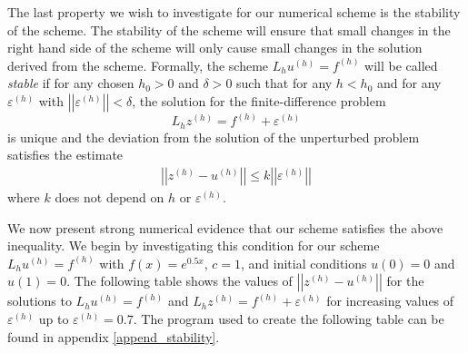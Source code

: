 The last property we wish to investigate for our numerical scheme is the
stability of the scheme. The stability of the scheme will ensure that small
changes in the right hand side of the scheme will only cause small changes in
the solution derived from the scheme. Formally, the scheme $L_h u^{(h)} = f^{(h)}$
will be called \textit{stable} if for any chosen $h_0 > 0$ and $\delta > 0$ such
that for any $h < h_0$ and for any $\varepsilon^{(h)}$ with
$\left|\left| \varepsilon^{(h)} \right|\right| < \delta$, the solution for the
finite-difference problem
$$L_h z^{(h)} = f^{(h)} + \varepsilon^{(h)}$$
is unique and the deviation from the solution of the unperturbed problem satisfies
the estimate
\begin{align}\label{stability_ineq}
  \left|\left| z^{(h)} - u^{(h)} \right|\right| \leq k \left|\left| \varepsilon^{(h)} \right|\right|
\end{align}
where $k$ does not depend on $h$ or $\varepsilon^{(h)}$.

We now present strong numerical evidence that our scheme satisfies the above
inequality.
We begin by investigating this condition for our scheme $L_h u^{(h)} = f^{(h)}$ with
$f(x) = e^{0.5x}$, $c=1$, and initial conditions $u(0) = 0$ and $u(1) = 0$. The
following table shows the values of $\left|\left|z^{(h)} - u^{(h)}\right|\right|$
for the solutions to $L_h u^{(h)} = f^{(h)}$ and
$L_h z^{(h)} = f^{(h)} + \varepsilon^{(h)}$ for increasing values of
$\varepsilon^{(h)}$ up to $\varepsilon^{(h)} = 0.7$. The program used to create
the following table can be found in appendix \ref{append_stability}.

